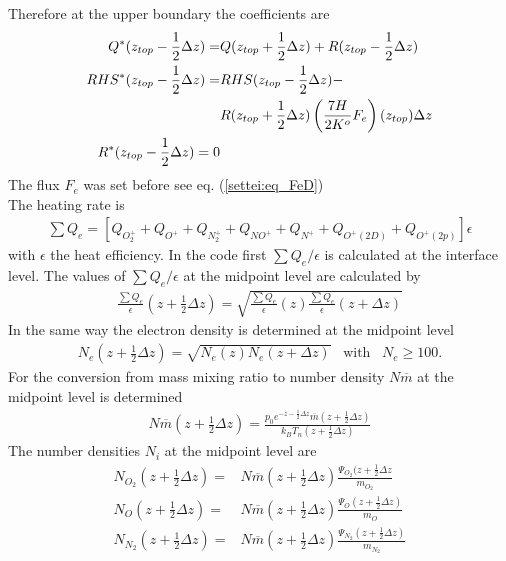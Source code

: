 %
%
Therefore at the upper boundary the coefficients are
%
\begin{align}
  Q^*(z_{top}-\frac{1}{2} \Delta z) = & Q(z_{top}+\frac{1}{2} \Delta z) +
          R(z_{top}-\frac{1}{2} \Delta z)\\
  RHS^*(z_{top}-\frac{1}{2} \Delta z) = & RHS(z_{top}-\frac{1}{2} \Delta z) - \notag \\
        {} &  R(z_{top}+\frac{1}{2} \Delta z) \left( \frac{7H}{2 K^o} F_e \right) (z_{top}) \Delta z \\
  R^*(z_{top}-\frac{1}{2} \Delta z) = 0
\end{align}
%
The flux $F_e$ was set before see eq. (\ref{settei:eq_FeD}) \\

The heating rate is
%
\begin{align}
\sum Q_e = \left[ Q_{O_2^+}+ Q_{O^+}+Q_{N_2^+}+Q_{NO^+}+Q_{N^+}+Q_{O^+(2D)}+Q_{O^+(2p)}\right] \epsilon
\end{align}
%
with $\epsilon$ the heat efficiency. In the code first $\sum Q_e/\epsilon$ is calculated
at the interface level. The values of $\sum Q_e/\epsilon$
 at the midpoint level
are calculated by
%
\begin{align}
  \frac{\sum Q_e}{\epsilon}(z+\frac{1}{2} \Delta z) = \sqrt{\frac{\sum Q_e}{\epsilon}(z)
        \frac{\sum Q_e}{\epsilon}(z+\Delta z)}
\end{align}
%
In the same way the electron density is determined at the midpoint level
%
\begin{align}
  N_e(z+\frac{1}{2} \Delta z) = \sqrt{N_e(z)
        N_e(z+\Delta z)} \; \; \; \text{with} \; \; \; N_e \geq 100.
\end{align}
%
For the conversion from mass mixing ratio to number density $N \overline{m}$
at the midpoint level is determined
%
\begin{align}
   N \overline{m}(z+\frac{1}{2} \Delta z) = \frac{p_0 e^{-z-\frac{1}{2}\Delta z}
         \overline{m}(z+\frac{1}{2} \Delta z)}{k_B T_n(z+\frac{1}{2} \Delta z)}
\end{align}
%
The number densities $N_i$ at the midpoint level are
%
\begin{align}
   N_{O_2}(z+\frac{1}{2} \Delta z) = & N \overline{m}(z+\frac{1}{2} \Delta z) \frac{\Psi_{O_2}(z+\frac{1}{2} \Delta z}{m_{O_2}} \\
   N_{O}(z+\frac{1}{2} \Delta z) = & N \overline{m}(z+\frac{1}{2} \Delta z) \frac{\Psi_{O}(z+\frac{1}{2} \Delta z)}{m_{O}} \\
   N_{N_2}(z+\frac{1}{2} \Delta z) = & N \overline{m}(z+\frac{1}{2} \Delta z) \frac{\Psi_{N_2}(z+\frac{1}{2} \Delta z)}{m_{N_2}}
\end{align}
